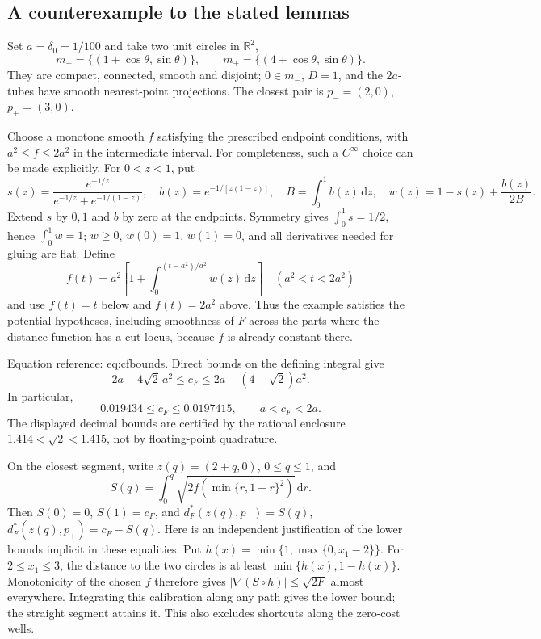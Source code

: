 \documentclass[10pt]{article}
\begin{document}
\subsection*{A counterexample to the stated lemmas}
Set \(a=\delta_0=1/100\) and take two unit circles in \(\mathbb R^2\), \[m_-=\{(1+\cos\theta,\sin\theta)\},\qquad
 m_+=\{(4+\cos\theta,\sin\theta)\}.\] They are compact, connected, smooth and disjoint; \(0\in m_-\), \(D=1\), and the \(2a\)-tubes have smooth nearest-point projections. The closest pair is \(p_-=(2,0)\), \(p_+=(3,0)\).\par
Choose a monotone smooth \(f\) satisfying the prescribed endpoint conditions, with \(a^2\leq f\leq2a^2\) in the intermediate interval. For completeness, such a \(C^\infty\) choice can be made explicitly. For \(0<z<1\), put \[s(z)=\frac{e^{-1/z}}{e^{-1/z}+e^{-1/(1-z)}},\quad
 b(z)=e^{-1/[z(1-z)]},\quad B=\int_0^1b(z)\,\mathrm dz,
 \quad w(z)=1-s(z)+\frac{b(z)}{2B}.\] Extend \(s\) by \(0,1\) and \(b\) by zero at the endpoints. Symmetry gives \(\int_0^1s=1/2\), hence \(\int_0^1w=1\); \(w\geq0\), \(w(0)=1\), \(w(1)=0\), and all derivatives needed for gluing are flat. Define \[f(t)=a^2\left[1+\int_0^{(t-a^2)/a^2}w(z)\,\mathrm dz\right]
       \quad(a^2<t<2a^2)\] and use \(f(t)=t\) below and \(f(t)=2a^2\) above. Thus the example satisfies the potential hypotheses, including smoothness of \(F\) across the parts where the distance function has a cut locus, because \(f\) is already constant there.\par
Equation reference: eq:cfbounds. Direct bounds on the defining integral give \[2a-4\sqrt2\,a^2\leq c_F
 \leq 2a-(4-\sqrt2)a^2.\] In particular, \[
 0.019434\leq c_F\leq0.0197415,\qquad a<c_F<2a.\] The displayed decimal bounds are certified by the rational enclosure \(1.414<\sqrt2<1.415\), not by floating-point quadrature.\par
On the closest segment, write \(z(q)=(2+q,0)\), \(0\leq q\leq1\), and \[S(q)=\int_0^q\sqrt{2f(\min\{r,1-r\}^2)}\,\mathrm dr.\] Then \(S(0)=0\), \(S(1)=c_F\), and \(d_F^*(z(q),p_-)=S(q)\), \(d_F^*(z(q),p_+)=c_F-S(q)\). Here is an independent justification of the lower bounds implicit in these equalities. Put \(h(x)=\min\{1,\max\{0,x_1-2\}\}\). For \(2\leq x_1\leq3\), the distance to the two circles is at least \(\min\{h(x),1-h(x)\}\). Monotonicity of the chosen \(f\) therefore gives \(|\nabla(S\circ h)|\leq\sqrt{2F}\) almost everywhere. Integrating this calibration along any path gives the lower bound; the straight segment attains it. This also excludes shortcuts along the zero-cost wells.\par
\end{document}
